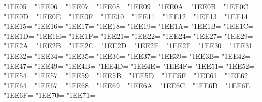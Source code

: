 \XeTeXcharclass"1EE05=\KclassArabU
\XeTeXcharclass"1EE06=\KclassArabU
\XeTeXcharclass"1EE07=\KclassArabU
\XeTeXcharclass"1EE08=\KclassArabU
\XeTeXcharclass"1EE09=\KclassArabU
\XeTeXcharclass"1EE0A=\KclassArabU
\XeTeXcharclass"1EE0B=\KclassArabU
\XeTeXcharclass"1EE0C=\KclassArabU
\XeTeXcharclass"1EE0D=\KclassArabU
\XeTeXcharclass"1EE0E=\KclassArabU
\XeTeXcharclass"1EE0F=\KclassArabU
\XeTeXcharclass"1EE10=\KclassArabU
\XeTeXcharclass"1EE11=\KclassArabU
\XeTeXcharclass"1EE12=\KclassArabU
\XeTeXcharclass"1EE13=\KclassArabU
\XeTeXcharclass"1EE14=\KclassArabU
\XeTeXcharclass"1EE15=\KclassArabU
\XeTeXcharclass"1EE16=\KclassArabU
\XeTeXcharclass"1EE17=\KclassArabU
\XeTeXcharclass"1EE18=\KclassArabU
\XeTeXcharclass"1EE19=\KclassArabU
\XeTeXcharclass"1EE1A=\KclassArabU
\XeTeXcharclass"1EE1B=\KclassArabU
\XeTeXcharclass"1EE1C=\KclassArabU
\XeTeXcharclass"1EE1D=\KclassArabU
\XeTeXcharclass"1EE1E=\KclassArabU
\XeTeXcharclass"1EE1F=\KclassArabU
\XeTeXcharclass"1EE21=\KclassArabU
\XeTeXcharclass"1EE22=\KclassArabU
\XeTeXcharclass"1EE24=\KclassArabU
\XeTeXcharclass"1EE27=\KclassArabU
\XeTeXcharclass"1EE29=\KclassArabU
\XeTeXcharclass"1EE2A=\KclassArabU
\XeTeXcharclass"1EE2B=\KclassArabU
\XeTeXcharclass"1EE2C=\KclassArabU
\XeTeXcharclass"1EE2D=\KclassArabU
\XeTeXcharclass"1EE2E=\KclassArabU
\XeTeXcharclass"1EE2F=\KclassArabU
\XeTeXcharclass"1EE30=\KclassArabU
\XeTeXcharclass"1EE31=\KclassArabU
\XeTeXcharclass"1EE32=\KclassArabU
\XeTeXcharclass"1EE34=\KclassArabU
\XeTeXcharclass"1EE35=\KclassArabU
\XeTeXcharclass"1EE36=\KclassArabU
\XeTeXcharclass"1EE37=\KclassArabU
\XeTeXcharclass"1EE39=\KclassArabU
\XeTeXcharclass"1EE3B=\KclassArabU
\XeTeXcharclass"1EE42=\KclassArabU
\XeTeXcharclass"1EE47=\KclassArabU
\XeTeXcharclass"1EE49=\KclassArabU
\XeTeXcharclass"1EE4B=\KclassArabU
\XeTeXcharclass"1EE4D=\KclassArabU
\XeTeXcharclass"1EE4E=\KclassArabU
\XeTeXcharclass"1EE4F=\KclassArabU
\XeTeXcharclass"1EE51=\KclassArabU
\XeTeXcharclass"1EE52=\KclassArabU
\XeTeXcharclass"1EE54=\KclassArabU
\XeTeXcharclass"1EE57=\KclassArabU
\XeTeXcharclass"1EE59=\KclassArabU
\XeTeXcharclass"1EE5B=\KclassArabU
\XeTeXcharclass"1EE5D=\KclassArabU
\XeTeXcharclass"1EE5F=\KclassArabU
\XeTeXcharclass"1EE61=\KclassArabU
\XeTeXcharclass"1EE62=\KclassArabU
\XeTeXcharclass"1EE64=\KclassArabU
\XeTeXcharclass"1EE67=\KclassArabU
\XeTeXcharclass"1EE68=\KclassArabU
\XeTeXcharclass"1EE69=\KclassArabU
\XeTeXcharclass"1EE6A=\KclassArabU
\XeTeXcharclass"1EE6C=\KclassArabU
\XeTeXcharclass"1EE6D=\KclassArabU
\XeTeXcharclass"1EE6E=\KclassArabU
\XeTeXcharclass"1EE6F=\KclassArabU
\XeTeXcharclass"1EE70=\KclassArabU
\XeTeXcharclass"1EE71=\KclassArabU

